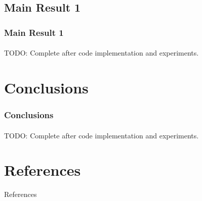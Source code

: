\documentclass[11pt]{beamer}              %
\begin{document}
\subsection{Main Result 1}
\begin{frame}
\frametitle{Main Result 1}
\framesubtitle{}

TODO: Complete after code implementation and experiments.

\end{frame}


\section{Conclusions}
\begin{frame}
\frametitle{Conclusions}
\framesubtitle{}

TODO: Complete after code implementation and experiments.

\end{frame}

\section*{References}
\begin{frame}{References}
\tiny


\end{frame}



\thankslide
\end{document}

